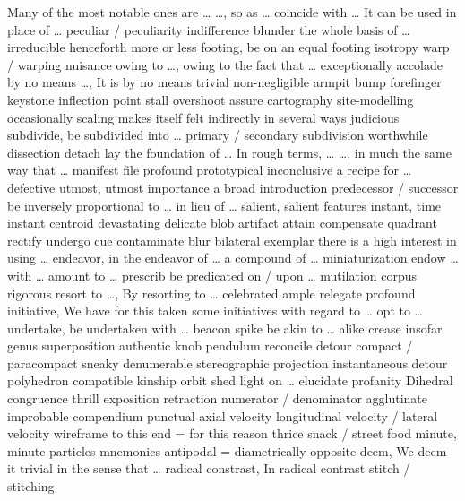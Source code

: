 \documentclass[12pt]{article}
\begin{document}
Many of the most notable ones are \dots 
\dots, so as \dots 
coincide with \dots 
It can be used in place of \dots 
peculiar / peculiarity 
indifference 
blunder 
the whole basis of \dots 
irreducible 
henceforth 
more or less 
footing, be on an equal footing 
isotropy 
warp / warping 
nuisance 
owing to \dots, owing to the fact that \dots 
exceptionally 
accolade 
by no means \dots, It is by no means trivial 
non-negligible 
armpit 
bump 
forefinger 
keystone 
inflection point 
stall 
overshoot 
assure 
cartography 
site-modelling 
occasionally 
scaling makes itself felt indirectly in several ways 
judicious 
subdivide, be subdivided into \dots 
primary / secondary 
subdivision 
worthwhile 
dissection 
detach 
lay the foundation of \dots 
In rough terms, \dots 
\dots, in much the same way that \dots 
manifest file 
profound 
prototypical 
inconclusive 
a recipe for \dots 
defective 
utmost, utmost importance 
a broad introduction 
predecessor / successor 
be inversely proportional to \dots 
in lieu of \dots 
salient, salient features 
instant, time instant 
centroid 
devastating 
delicate 
blob 
artifact 
attain 
compensate 
quadrant 
rectify 
undergo 
cue 
contaminate 
blur 
bilateral 
exemplar 
there is a high interest in using \dots 
endeavor, in the endeavor of \dots 
a compound of \dots 
miniaturization 
endow \dots with \dots 
amount to \dots 
prescrib 
be predicated on / upon \dots 
mutilation 
corpus 
rigorous 
resort to \dots, By resorting to \dots 
celebrated 
ample 
relegate 
profound 
initiative, We have for this taken some initiatives with regard to \dots 
opt to \dots 
undertake, be undertaken with \dots 
beacon 
spike 
be akin to \dots 
alike 
crease 
insofar 
genus 
superposition 
authentic 
knob 
pendulum 
reconcile 
detour 
compact / paracompact 
sneaky 
denumerable 
stereographic projection 
instantaneous 
detour 
polyhedron 
compatible 
kinship 
orbit 
shed light on \dots 
elucidate 
profanity 
Dihedral 
congruence 
thrill 
exposition 
retraction 
numerator / denominator 
agglutinate 
improbable 
compendium 
punctual 
axial velocity 
longitudinal velocity / lateral velocity 
wireframe 
to this end = for this reason 
thrice 
snack / street food 
minute, minute particles 
mnemonics 
antipodal = diametrically opposite 
deem, We deem it trivial in the sense that \dots 
radical constrast, In radical contrast 
stitch / stitching 
\end{document}
